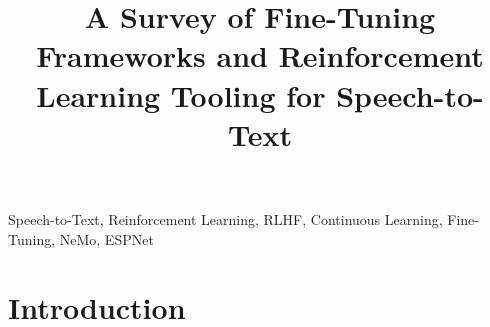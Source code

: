 \documentclass[conference]{IEEEtran}
\begin{document}
\title{A Survey of Fine-Tuning Frameworks and Reinforcement Learning Tooling for Speech-to-Text}

\author{
}

\maketitle

\begin{abstract}
\end{abstract}

\begin{IEEEkeywords}
Speech-to-Text, Reinforcement Learning, RLHF, Continuous Learning, Fine-Tuning, NeMo, ESPNet
\end{IEEEkeywords}


\section{Introduction}
%
%
\end{document}
